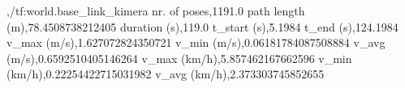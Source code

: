 ,/tf:world.base_link_kimera
nr. of poses,1191.0
path length (m),78.4508738212405
duration (s),119.0
t_start (s),5.1984
t_end (s),124.1984
v_max (m/s),1.627072824350721
v_min (m/s),0.06181784087508884
v_avg (m/s),0.6592510405146264
v_max (km/h),5.857462167662596
v_min (km/h),0.22254422715031982
v_avg (km/h),2.373303745852655
